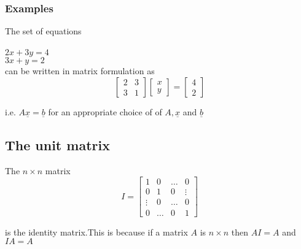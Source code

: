 \documentclass[12pt,a4paper]{article}
\theoremstyle{regla}
\theoremstyle{remark}
\theoremstyle{definition}
\theoremstyle{nonumberbreak}
\begin{document}
\subsubsection{Examples}
\begin{xmpl}
The set of equations\\
\\
$2x+3y=4$ \\
$3x+y=2$ \\

can be written in matrix formulation as\\

$$\begin{bmatrix}
2 & 3  \\
3 & 1 
\end{bmatrix}
\begin{bmatrix}
x \\
y
\end{bmatrix} =
\begin{bmatrix}
4 \\
2
\end{bmatrix}
$$

i.e. $A\underline{x} = \underline{b}$ for an appropriate choice of of $A, \underline{x}$ and $\underline{b}$
\end{xmpl}

\subsection{The unit matrix}
\begin{fbox}
\begin{minipage}{0.97\textwidth}
The $n\times n$ matrix \\

\begin{equation*}
I=
\left[
\begin{array}{cccc}
  1 & 0 & \ldots & 0 \\
  0 & 1 & 0  & \vdots \\
  \vdots & 0  & \dots & 0 \\
  0 & \ldots & 0 & 1
\end{array} \right]
\end{equation*}

is the identity matrix.This is because if a matrix 
$A$ is $n\times n$ then 
$A I = A$ and 
$I A  = A$
\end{minipage}
\end{fbox}

\end{document}
